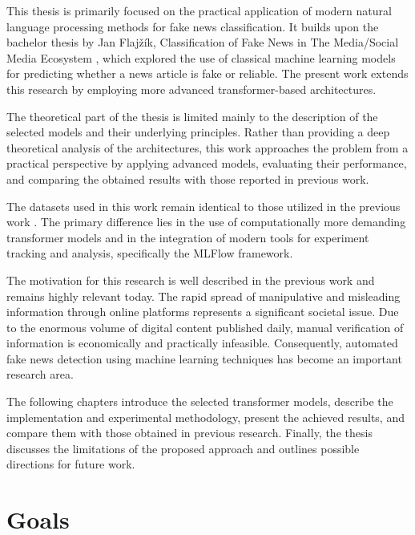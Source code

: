 \begin{markdown}

This thesis is primarily focused on the practical application of modern natural language processing methods for fake news classification. It builds upon the bachelor thesis by Jan Flajžík, Classification of Fake News in The Media/Social Media Ecosystem \cite{flajzik_classification_2024}, which explored the use of classical machine learning models for predicting whether a news article is fake or reliable. The present work extends this research by employing more advanced transformer-based architectures.

The theoretical part of the thesis is limited mainly to the description of the selected models and their underlying principles. Rather than providing a deep theoretical analysis of the architectures, this work approaches the problem from a practical perspective by applying advanced models, evaluating their performance, and comparing the obtained results with those reported in previous work.

The datasets used in this work remain identical to those utilized in the previous work \cite{flajzik_classification_2024}. The primary difference lies in the use of computationally more demanding transformer models and in the integration of modern tools for experiment tracking and analysis, specifically the MLFlow framework.

The motivation for this research is well described in the previous work \cite{flajzik_classification_2024} and remains highly relevant today. The rapid spread of manipulative and misleading information through online platforms represents a significant societal issue. Due to the enormous volume of digital content published daily, manual verification of information is economically and practically infeasible. Consequently, automated fake news detection using machine learning techniques has become an important research area.

The following chapters introduce the selected transformer models, describe the implementation and experimental methodology, present the achieved results, and compare them with those obtained in previous research. Finally, the thesis discusses the limitations of the proposed approach and outlines possible directions for future work.
      
\end{markdown}

\section{Goals}

